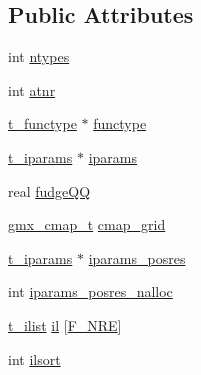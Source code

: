 \subsection*{\-Public \-Attributes}
\begin{DoxyCompactItemize}
\item 
int \hyperlink{structt__idef_afa4f6458df582ca8088573b85f68c8ae}{ntypes}
\item 
int \hyperlink{structt__idef_ac0de032c9fe33bc65755c359d7724d71}{atnr}
\item 
\hyperlink{include_2types_2idef_8h_a8150aed9cb62c0b3826244d7caeb0a57}{t\-\_\-functype} $\ast$ \hyperlink{structt__idef_a785c235c717f68948b955ba78ca30a64}{functype}
\item 
\hyperlink{uniont__iparams}{t\-\_\-iparams} $\ast$ \hyperlink{structt__idef_af719694c7cdeeffb58ccdd8e266efb6c}{iparams}
\item 
real \hyperlink{structt__idef_a48f83a21c84e6e72037eb6819fcbe7ed}{fudge\-Q\-Q}
\item 
\hyperlink{structgmx__cmap__t}{gmx\-\_\-cmap\-\_\-t} \hyperlink{structt__idef_a6dbf1ff8b2e89d14db052b7108f1a31a}{cmap\-\_\-grid}
\item 
\hyperlink{uniont__iparams}{t\-\_\-iparams} $\ast$ \hyperlink{structt__idef_a035264725416879f3c135db6a4754e98}{iparams\-\_\-posres}
\item 
int \hyperlink{structt__idef_abf094a1cf982aa4ddd1a16b86dfe8e20}{iparams\-\_\-posres\-\_\-nalloc}
\item 
\hyperlink{structt__ilist}{t\-\_\-ilist} \hyperlink{structt__idef_aedcd0c305ab397c2b6fc75eb66b3b97c}{il} \mbox{[}\hyperlink{share_2template_2gromacs_2types_2idef_8h_aa52ea6a123f47db5e6b145e5fc5e369aa619bce9d967702fd746289c3f61269f2}{\-F\-\_\-\-N\-R\-E}\mbox{]}
\item 
int \hyperlink{structt__idef_a196376f25ccf4a60673875b1a9d99a24}{ilsort}
\end{DoxyCompactItemize}


